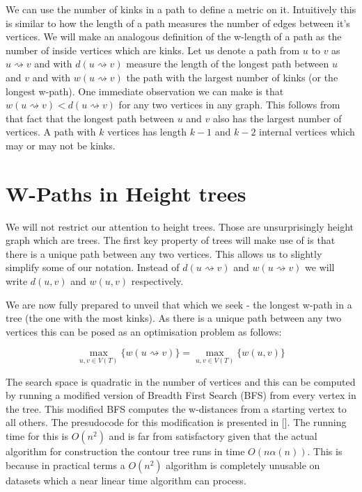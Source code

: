 We can use the number of kinks in a path to define a metric on it. Intuitively this is similar to how the length of a path measures the number of edges between it's vertices. We will make an analogous definition of the w-length of a path as the number of inside vertices which are kinks. Let us denote a path from $u$ to $v$ as $u \rightsquigarrow v$ and with $d(u \rightsquigarrow v)$ measure the length of the longest path between $u$ and $v$ and with $w(u \rightsquigarrow v)$ the path with the largest number of kinks (or the longest w-path). One immediate observation we can make is that $w(u \rightsquigarrow v) < d(u \rightsquigarrow v)$ for any two vertices in any graph. This follows from that fact that the longest path between $u$ and $v$ also has the largest number of vertices. A path with $k$ vertices has length $k-1$ and $k-2$ internal vertices which may or may not be kinks.


\section{W-Paths in Height trees}

We will not restrict our attention to height trees. Those are unsurprisingly height graph which are trees. The first key property of trees will make use of is that there is a unique path between any two vertices. This allows us to slightly simplify some of our notation.  Instead of  $d(u \rightsquigarrow v)$ and $w(u \rightsquigarrow v)$ we will write $d(u, v)$ and $w(u, v)$ respectively.  

We are now fully prepared to unveil that which we seek - the longest w-path in a tree (the one with the most kinks). As there is a unique path between any two vertices this can be posed as an optimisation problem as follows:

$$ \max_{u, v \in V(T)}\{ w(u \rightsquigarrow v) \} =  \max_{u, v \in V(T)}\{ w(u, v) \} $$

The search space is quadratic in the number of vertices and this can be computed by running a modified version of Breadth First Search (BFS) from every vertex in the tree. This modified BFS computes the w-distances from a starting vertex to all others. The presudocode for this modification is presented in []. The running time for this is $O(n^2)$ and is far from satisfactory given that the actual algorithm for construction the contour tree runs in time $O(n\alpha(n))$. This is because in practical terms a $O(n^2)$ algorithm is completely unusable on datasets which a near linear time algorithm can process.

